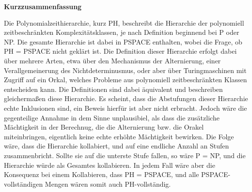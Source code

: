 \newpage

\vspace*{1cm}

\begin{center}
    \textbf{Kurzzusammenfassung}
\end{center}

\vspace*{1cm}

\noindent 
Die Polynomialzeithierarchie, kurz PH, beschreibt die Hierarchie der polynomiell zeitbeschränkten Komplexitätsklassen, je nach Definition beginnend bei P oder NP.
Die gesamte Hierarchie ist dabei in PSPACE enthalten, wobei die Frage, ob PH = PSPACE nicht geklärt ist.
Die Definition dieser Hierarchie erfolgt dabei über mehrere Arten, etwa über den Mechanismus der Alternierung, einer Verallgemeinerung des Nichtdeterminusmus, oder aber über Turingmaschinen mit Zugriff auf ein Orkal, welches 
Probleme aus polynomiell zeitbeschränkten Klassen entscheiden kann. Die Definitionen sind dabei äquivalent und beschreiben gleichermaßen diese Hierarchie. Es scheint, dass die Abstufungen
dieser Hierarchie echte Inklusionen sind, ein Beweis hierfür ist aber nicht erbracht. Jedoch wäre die gegenteilige Annahme in dem Sinne unplausibiel, als dass die zusätzliche Mächtigkeit in der Berechnug, die 
die Alternierung bzw. die Orakel miteinbringen, eigentlich keine echte erhöhte Mächtigkeit bewirken. Die Folge wäre, dass die Hierarchie kollabiert, und auf eine endliche Anzahl an Stufen zusammenbricht. Sollte sie auf die unterste Stufe fallen, so wäre P = NP,
und die Hierarchie würde als Gesamtes kollabieren. In jedem Fall wäre aber die Konsequenz bei einem Kollabieren, dass PH = PSPACE, und alle PSPACE-vollständigen Mengen wären somit auch PH-vollständig.